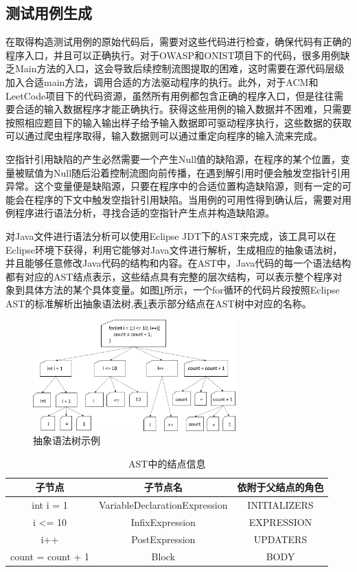 \subsection{测试用例生成}
在取得构造测试用例的原始代码后，需要对这些代码进行检查，确保代码有正确的程序入口，并且可以正确执行。对于OWASP和ONIST项目下的代码，很多用例缺乏Main方法的入口，这会导致后续控制流图提取的困难，这时需要在源代码层级加入合适main方法，调用合适的方法驱动程序的执行。此外，对于ACM和LeetCode项目下的代码资源，虽然所有用例都包含正确的程序入口，但是往往需要合适的输入数据程序才能正确执行。获得这些用例的输入数据并不困难，只需要按照相应题目下的输入输出样子给予输入数据即可驱动程序执行，这些数据的获取可以通过爬虫程序取得，输入数据则可以通过重定向程序的输入流来完成。

空指针引用缺陷的产生必然需要一个产生Null值的缺陷源，在程序的某个位置，变量被赋值为Null随后沿着控制流图向前传播，在遇到解引用时便会触发空指针引用异常。这个变量便是缺陷源，只要在程序中的合适位置构造缺陷源，则有一定的可能会在程序的下文中触发空指针引用缺陷。当用例的可用性得到确认后，需要对用例程序进行语法分析，寻找合适的空指针产生点并构造缺陷源。

对Java文件进行语法分析可以使用Eclipse JDT下的AST来完成，该工具可以在Eclipse环境下获得，利用它能够对Java文件进行解析，生成相应的抽象语法树，并且能够任意修改Java代码的结构和内容。在AST中，Java代码的每一个语法结构都有对应的AST结点表示，这些结点具有完整的层次结构，可以表示整个程序对象到具体方法的某个具体变量。如图\ref{fig:figure4-2}所示，一个for循环的代码片段按照Eclipse AST的标准解析出抽象语法树,表\ref{tab:table4-1}表示部分结点在AST树中对应的名称。

\begin{figure}
	\centering
	\includegraphics[width=0.70\textwidth]{figures/ast4-2}
	\caption{抽象语法树示例}\label{fig:figure4-2}
\end{figure}

\begin{table}
	\centering
	\caption{AST中的结点信息} \label{tab:table4-1}
	\begin{tabular*}{0.9\textwidth}{@{\extracolsep{\fill}}ccc}
		\toprule
		子节点	&子节点名	&依附于父结点的角色 \\
		\midrule
		int i = 1	&VariableDeclarationExpression	&INITIALIZERS \\
		i <= 10	&InfixExpression	&EXPRESSION \\
		i++	&PostExpression	&UPDATERS \\
		{ count = count + 1 }	&Block	&BODY \\
		\bottomrule
	\end{tabular*}
\end{table}

